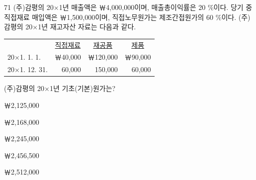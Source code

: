 \begin{question}{71}
(주)감평의 20×1년 매출액은 ￦4,000,000이며, 매출총이익률은 20 \%이다. 당기 중 직접재료 매입액은 ￦1,500,000이며, 직접노무원가는 제조간접원가의 60 \%이다.
(주)감평의 20×1년 재고자산 자료는 다음과 같다.
\begin{tcolorbox}[enhanced, colback=white, colframe=black, boxrule=0.4pt, arc=0pt, left=4pt, right=4pt, top=4pt, bottom=4pt]
\begin{tabular}{@{}l r r r@{}}
 & \multicolumn{1}{c}{\uline{\hspace{1.2em}직접재료\hspace{1.2em}}} & \multicolumn{1}{c}{\uline{\hspace{1.2em}재공품\hspace{1.2em}}} & \multicolumn{1}{c}{\uline{\hspace{1.2em}제품\hspace{1.2em}}} \\
20×1. 1. 1. & ￦40,000 & ￦120,000 & ￦90,000 \\
20×1. 12. 31. & 60,000 & 150,000 & 60,000
\end{tabular}
\end{tcolorbox}
(주)감평의 20×1년 기초(기본)원가는?
\begin{choices}
  \item ￦2,125,000
  \item ￦2,168,000
  \item ￦2,245,000
  \item ￦2,456,500
  \item ￦2,512,000
\end{choices}
\end{question}
